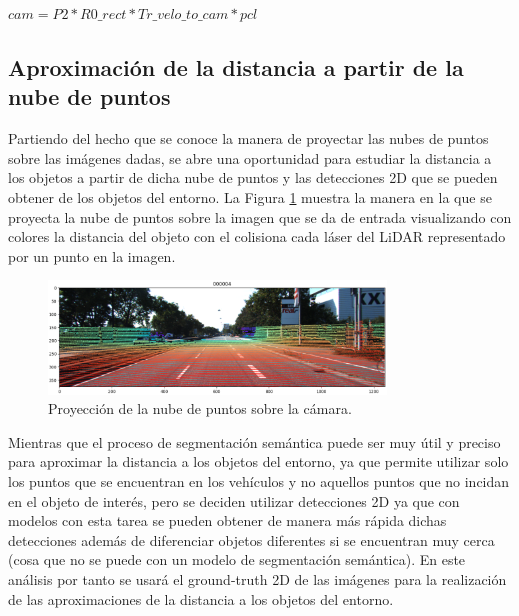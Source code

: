 \begin{center}
$
\textit{cam} = \textit{P2} * \textit{R0\_rect} * \textit{Tr\_velo\_to\_cam} * \textit{pcl}
$
\end{center}

\subsection{Aproximación de la distancia a partir de la nube de puntos}
\label{sec:Aproximación de la distancia a partir de la nube de puntos}

Partiendo del hecho que se conoce la manera de proyectar las nubes de puntos sobre las imágenes dadas, se abre una oportunidad para estudiar la distancia a los objetos a partir de dicha nube de puntos y las detecciones 2D que se pueden obtener de los objetos del entorno. La Figura \ref{fig:Proyección de la nube de puntos sobre la cámara.} muestra la manera en la que se proyecta la nube de puntos sobre la imagen que se da de entrada visualizando con colores la distancia del objeto con el colisiona cada láser del \ac{LiDAR} representado por un punto en la imagen.

\begin{figure}[H]
    \centering
    \includegraphics[width=0.8\textwidth]{Book/figures/6_approx_distancia/pcl_projection_kitti2.png}
    \caption{Proyección de la nube de puntos sobre la cámara.}
    \label{fig:Proyección de la nube de puntos sobre la cámara.}
\end{figure}

Mientras que el proceso de segmentación semántica puede ser muy útil y preciso para aproximar la distancia a los objetos del entorno, ya que permite utilizar solo los puntos que se encuentran en los vehículos y no aquellos puntos que no incidan en el objeto de interés, pero se deciden utilizar detecciones 2D ya que con modelos con esta tarea se pueden obtener de manera más rápida dichas detecciones además de diferenciar objetos diferentes si se encuentran muy cerca (cosa que no se puede con un modelo de segmentación semántica). En este análisis por tanto se usará el ground-truth 2D de las imágenes para la realización de las aproximaciones de la distancia a los objetos del entorno.


